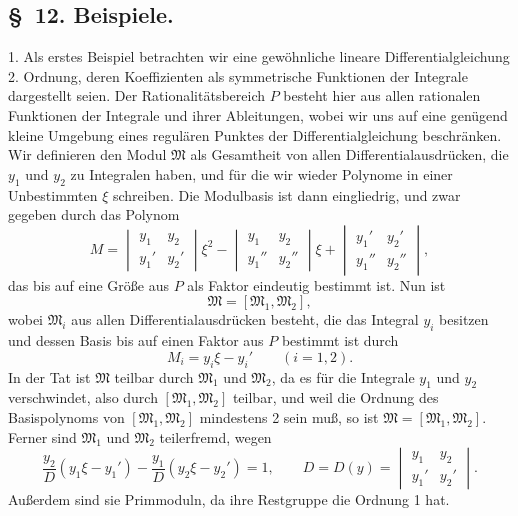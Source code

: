 \documentclass[11pt]{article}
\begin{document}
\subsection*{\S~12. Beispiele.}

1. Als erstes Beispiel betrachten wir eine gewöhnliche lineare Differentialgleichung 2. Ordnung, deren Koeffizienten als symmetrische Funktionen der Integrale dargestellt seien. Der Rationalitätsbereich $P$ besteht hier aus allen rationalen Funktionen der Integrale und ihrer Ableitungen, wobei wir uns auf eine genügend kleine Umgebung eines regulären Punktes der Differentialgleichung beschränken. Wir definieren den Modul $\mathfrak M$ als Gesamtheit von allen Differentialausdrücken, die $y_1$ und $y_2$ zu Integralen haben, und für die wir wieder Polynome in einer Unbestimmten $\xi$ schreiben. Die Modulbasis ist dann eingliedrig, und zwar gegeben durch das Polynom
\[
 M=
 \begin{vmatrix} y_1&y_2\\ y_1'&y_2'\end{vmatrix}\xi^2
 -\begin{vmatrix} y_1&y_2\\ y_1''&y_2''\end{vmatrix}\xi
 +\begin{vmatrix} y_1'&y_2'\\ y_1''&y_2''\end{vmatrix},
\]
das bis auf eine Größe aus $P$ als Faktor eindeutig bestimmt ist. Nun ist
\begin{equation}
 \mathfrak M=[\mathfrak M_1,
\mathfrak M_2],
\tag{41}
\end{equation}
wobei $\mathfrak M_i$ aus allen Differentialausdrücken besteht, die das Integral $y_i$ besitzen und dessen Basis bis auf einen Faktor aus $P$ bestimmt ist durch
\[
 M_i=y_i\xi-y_i'\qquad(i=1,2).
\]
In der Tat ist $\mathfrak M$ teilbar durch $\mathfrak M_1$ und $\mathfrak M_2$, da es für die Integrale $y_1$ und $y_2$ verschwindet, also durch $[\mathfrak M_1,
\mathfrak M_2]$ teilbar, und weil die Ordnung des Basispolynoms von $[\mathfrak M_1,
\mathfrak M_2]$ mindestens 2 sein muß, so ist $\mathfrak M=[\mathfrak M_1,
\mathfrak M_2]$. Ferner sind $\mathfrak M_1$ und $\mathfrak M_2$ teilerfremd, wegen
\begin{equation}
 \frac{y_2}{D}(y_1\xi-y_1')-\frac{y_1}{D}(y_2\xi-y_2')=1,
 \qquad
 D=D(y)=\begin{vmatrix}y_1&y_2\\ y_1'&y_2'\end{vmatrix}.
\tag{42}
\end{equation}
Außerdem sind sie Primmoduln, da ihre Restgruppe die Ordnung 1 hat.
\end{document}
